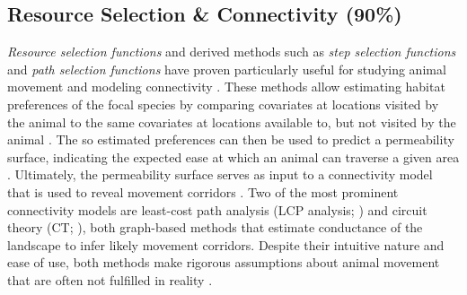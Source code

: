 \documentclass[abstract=on,10pt,a4paper,bibliography=totocnumbered]{article}
\begin{document}
\subsection{Resource Selection \& Connectivity (90\%)}
\textit{Resource selection functions} \citep{Boyce.2002} and derived methods
such as \textit{step selection functions} \citep{Fortin.2005} and \textit{path
selection functions} \citep{Cushman.2010} have proven particularly useful for
studying animal movement \citep{Fieberg.2020} and modeling connectivity
\citep{Diniz.2020}. These methods allow estimating habitat preferences of the
focal species by comparing covariates at locations visited by the animal to the
same covariates at locations available to, but not visited by the animal
\citep{Boyce.2002, Fortin.2005, Cushman.2010, Thurfjell.2014}. The so estimated
preferences can then be used to predict a permeability surface, indicating the
expected ease at which an animal can traverse a given area \citep{Spear.2010,
Zeller.2012, Etherington.2016}. Ultimately, the permeability surface serves as
input to a connectivity model that is used to reveal movement corridors
\citep{Diniz.2020}. Two of the most prominent connectivity models are least-cost
path analysis (LCP analysis; \citealp{Adriaensen.2003}) and circuit theory (CT;
\citealp{McRae.2006, McRae.2008}), both graph-based methods that estimate
conductance of the landscape to infer likely movement corridors. Despite their
intuitive nature and ease of use, both methods make rigorous assumptions about
animal movement that are often not fulfilled in reality \citep{Diniz.2020}.

\end{document}
